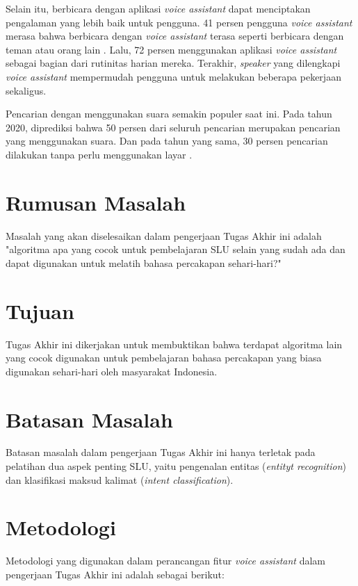 Selain itu, berbicara dengan aplikasi \textit{voice assistant} dapat menciptakan pengalaman yang lebih baik untuk pengguna. 41 persen pengguna \textit{voice assistant} merasa bahwa berbicara dengan \textit{voice assistant} terasa seperti berbicara dengan teman atau orang lain \parencite{kleinberg2018five}. Lalu, 72 persen menggunakan aplikasi \textit{voice assistant} sebagai bagian dari rutinitas harian mereka. Terakhir, \textit{speaker} yang dilengkapi \textit{voice assistant} mempermudah pengguna untuk melakukan beberapa pekerjaan sekaligus.

Pencarian dengan menggunakan suara semakin populer saat ini. Pada tahun 2020, diprediksi bahwa 50 persen dari seluruh pencarian merupakan pencarian yang menggunakan suara. Dan pada tahun yang sama, 30 persen pencarian dilakukan tanpa perlu menggunakan layar \parencite{kleinberg2018five}.

\section{Rumusan Masalah}

Masalah yang akan diselesaikan dalam pengerjaan Tugas Akhir ini adalah "algoritma apa yang cocok untuk pembelajaran SLU selain yang sudah ada dan dapat digunakan untuk melatih bahasa percakapan sehari-hari?"

\section{Tujuan}

Tugas Akhir ini dikerjakan untuk membuktikan bahwa terdapat algoritma lain yang cocok digunakan untuk pembelajaran bahasa percakapan yang biasa digunakan sehari-hari oleh masyarakat Indonesia.

\section{Batasan Masalah}

Batasan masalah dalam pengerjaan Tugas Akhir ini hanya terletak pada pelatihan dua aspek penting SLU, yaitu pengenalan entitas (\textit{entityt recognition}) dan klasifikasi maksud kalimat (\textit{intent classification}).

\section{Metodologi}

Metodologi yang digunakan dalam perancangan fitur \textit{voice assistant} dalam pengerjaan Tugas Akhir ini adalah sebagai berikut:

